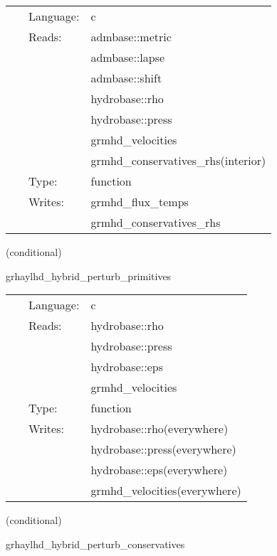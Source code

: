  \begin{tabular*}{160mm}{cll} 
~ & Language:  & c \\ 
~ & Reads:  & admbase::metric \\ 
~& ~ &admbase::lapse\\ 
~& ~ &admbase::shift\\ 
~& ~ &hydrobase::rho\\ 
~& ~ &hydrobase::press\\ 
~& ~ &grmhd\_velocities\\ 
~& ~ &grmhd\_conservatives\_rhs(interior)\\ 
~ & Type:  & function \\ 
~ & Writes:  & grmhd\_flux\_temps \\ 
~& ~ &grmhd\_conservatives\_rhs\\ 
\end{tabular*} 


\vspace{5mm}

   (conditional) 

\hspace{5mm} grhaylhd\_hybrid\_perturb\_primitives 

\hspace{5mm}{\it hybrid version of grhaylhd\_perturb\_primitives } 


\hspace{5mm}

 \begin{tabular*}{160mm}{cll} 
~ & Language:  & c \\ 
~ & Reads:  & hydrobase::rho \\ 
~& ~ &hydrobase::press\\ 
~& ~ &hydrobase::eps\\ 
~& ~ &grmhd\_velocities\\ 
~ & Type:  & function \\ 
~ & Writes:  & hydrobase::rho(everywhere) \\ 
~& ~ &hydrobase::press(everywhere)\\ 
~& ~ &hydrobase::eps(everywhere)\\ 
~& ~ &grmhd\_velocities(everywhere)\\ 
\end{tabular*} 


\vspace{5mm}

   (conditional) 

\hspace{5mm} grhaylhd\_hybrid\_perturb\_conservatives 

